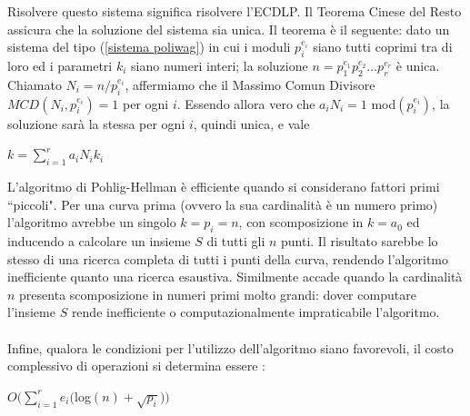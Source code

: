\documentclass[a4paper,12pt]{tesiinfo}
\begin{document}
Risolvere questo sistema significa risolvere l'ECDLP. Il Teorema Cinese del Resto assicura che la soluzione del sistema sia unica. Il teorema \`e il seguente: dato un sistema del tipo (\ref{sistema poliwag}) in cui i moduli $p_i^{e_i}$ siano tutti coprimi tra di loro ed i parametri $k_i$ siano numeri interi; la soluzione $n=p_1^{e_1}p_2^{e_2}\ldots p_r^{e_r}$ \`e unica. Chiamato $N_i = n \big /p_i^{e_i}$, affermiamo che il Massimo Comun Divisore $MCD(N_i, p_i^{e_i})=1$ per ogni $i$. Essendo allora vero che $a_iN_i =1 $ mod$(p_i^{e_i})$, la soluzione sar\`a la stessa per ogni $i$, quindi unica, e vale 
\begin{center}
$k={\displaystyle \sum_{i=1}^r} a_iN_ik_i$
\end{center}
L'algoritmo di Pohlig-Hellman \`e efficiente quando si considerano fattori primi ``piccoli". Per una curva prima (ovvero la sua cardinalit\`a \`e un numero primo) l'algoritmo avrebbe un singolo $k = p_i = n$, con scomposizione in $k = a_0$ ed inducendo a calcolare un insieme $S$ di tutti gli $n$ punti. Il risultato sarebbe lo stesso di una ricerca completa di tutti i punti della curva, rendendo l'algoritmo inefficiente quanto una ricerca esaustiva. Similmente accade quando la cardinalit\`a $n$ presenta scomposizione in numeri primi molto grandi: dover computare l'insieme $S$ rende inefficiente o computazionalmente impraticabile l'algoritmo.
\\
\\
Infine, qualora le condizioni per l'utilizzo dell'algoritmo siano favorevoli, il costo complessivo di operazioni si determina essere \cite{libro 800 pagine}:
\begin{center}
$O \Big ({\displaystyle \sum_{i=1}^r }e_i($log$(n) +\sqrt{p_i} )\Big )$
\end{center}
%
%
%
%
%
%
%
%
%
%
%
\end{document}
